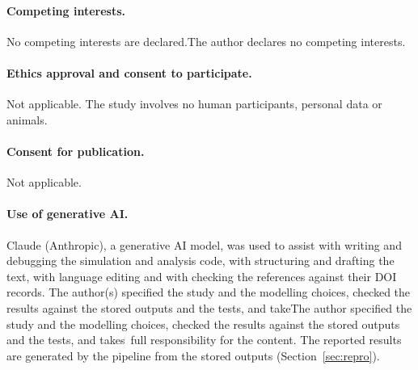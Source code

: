 \documentclass[10pt,a4paper,twocolumn]{article}
\theoremstyle{definition}
\begin{document}
\paragraph{Competing interests.} \ifnum{} No competing interests are declared.\else The author declares no competing interests.\fi

\paragraph{Ethics approval and consent to participate.} Not applicable. The study involves no human participants, personal data or animals.

\paragraph{Consent for publication.} Not applicable.

\paragraph{Use of generative AI.} Claude (Anthropic), a generative AI model, was used to assist with writing and debugging the simulation and analysis code, with structuring and drafting the text, with language editing and with checking the references against their DOI records. \ifnum{} The author(s) specified the study and the modelling choices, checked the results against the stored outputs and the tests, and take\else The author specified the study and the modelling choices, checked the results against the stored outputs and the tests, and takes\fi\ full responsibility for the content. The reported results are generated by the pipeline from the stored outputs (Section~\ref{sec:repro}).


\ifnum{} \else \fi
\end{document}
